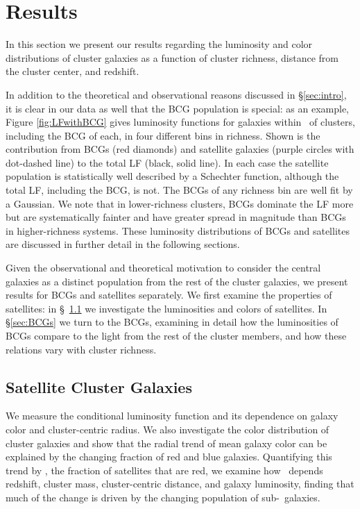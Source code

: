 \documentclass{emulateapj}
\begin{document}
\section{Results}\label{sec:results}
In this section we present our results regarding the luminosity and
color distributions of cluster galaxies as a function of cluster
richness, distance from the cluster center, and redshift.

In addition to the theoretical and observational reasons discussed in
\S \ref{sec:intro}, it is clear in our data as well that the BCG
population is special: as an example, Figure \ref{fig:LFwithBCG} gives
luminosity functions for galaxies within \rtwo\ of clusters, including
the BCG of each, in four different bins in richness. Shown is the
contribution from BCGs (red diamonds) and satellite galaxies (purple
circles with dot-dashed line) to the total LF (black, solid line). In
each case the satellite population is statistically well described by
a Schechter function, although the total LF, including the BCG, is
not. The BCGs of any richness bin are well fit by a Gaussian. We note that in
lower-richness clusters, BCGs dominate the LF more but are
systematically fainter and have greater spread in magnitude than BCGs
in higher-richness systems. These luminosity distributions of BCGs and
satellites are discussed in further detail in the following sections.

Given the observational and theoretical motivation to consider the
central galaxies as a distinct population from the rest of the cluster
galaxies, we present results for BCGs and satellites separately. We
first examine the properties of satellites: in \S\ \ref{sec:sats} we investigate the luminosities and colors of
satellites. In \S \ref{sec:BCGs} we turn to the BCGs, examining in
detail how the luminosities of BCGs compare to the light from the rest
of the cluster members, and how these relations vary with cluster
richness. 


\subsection{Satellite Cluster Galaxies}\label{sec:sats}
We measure the conditional luminosity function and its dependence on galaxy color and cluster-centric radius. We also investigate the color distribution of cluster galaxies and show that the radial trend of mean galaxy color can be explained by the changing fraction of red and blue galaxies. Quantifying this trend by \fred, the fraction of satellites that are red, we examine how \fred\ depends redshift, cluster mass, cluster-centric distance, and galaxy luminosity, finding that much of the change is driven by the changing population of sub-\Lstar\ galaxies.
\end{document}
